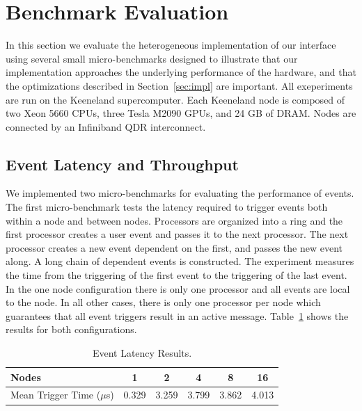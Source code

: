 
\section{Benchmark Evaluation}
\label{sec:micro}

In this section we evaluate the heterogeneous implementation of our 
interface using several small micro-benchmarks designed to illustrate
that our implementation approaches the underlying performance of the
hardware, and that the optimizations described in Section~\ref{sec:impl}
are important.  All exeperiments are run on the Keeneland
supercomputer\cite{Keeneland}.  Each Keeneland node is composed of
two Xeon 5660 CPUs, three Tesla M2090 GPUs, and 24 GB of DRAM.  Nodes
are connected by an Infiniband QDR interconnect.

\subsection{Event Latency and Throughput}
\label{subsec:eventmicro}
We implemented two micro-benchmarks for evaluating the performance of
events.  The first micro-benchmark tests the latency required to trigger
events both within a node and between nodes.  Processors are organized
into a ring and the first processor creates a user event and passes it
to the next processor.  The next processor creates a new event dependent
on the first, and passes the new event along. A long chain of dependent events 
is constructed.  The experiment measures the time from the triggering
of the first event to the triggering of the last event.  In the one node
configuration there is only one processor and all events are local to the
node.  In all other cases, there is only one processor per node which
guarantees that all event triggers result in an active message.  
Table~\ref{tab:eventlat} shows the results for both configurations.

\begin{table}
\begin{center}
{ \small
\begin{tabular}{m{2cm}|c|c|c|c|c}
Nodes & 1 & 2 & 4 & 8 & 16 \\ \hline
Mean Trigger Time ($\mu$s) & 0.329 & 3.259 & 3.799 & 3.862 & 4.013 \\
\end{tabular}
}
\end{center}
\vspace{-6mm}
\caption{Event Latency Results.\label{tab:eventlat}}
\vspace{-4mm}
\end{table}


